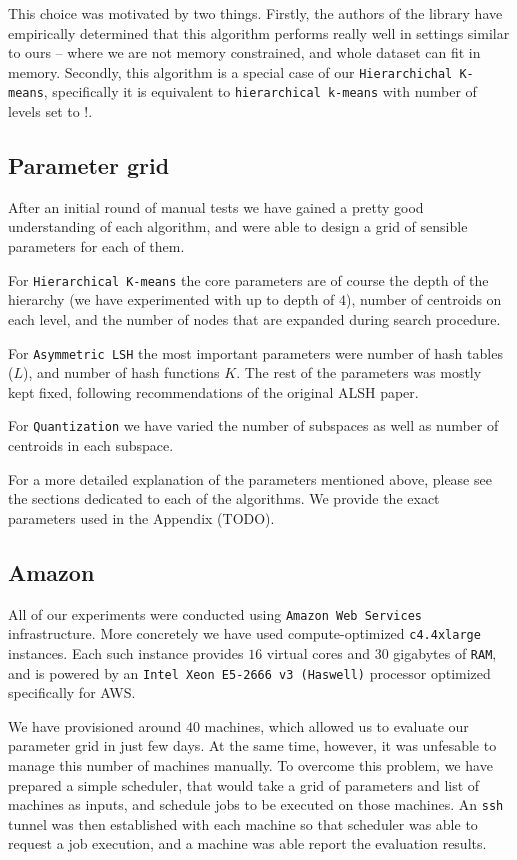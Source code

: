         This choice was motivated by two things.
        Firstly, the authors of the library have empirically determined that this algorithm performs
        really well in settings similar to ours -- where we are not memory constrained, and whole dataset
        can fit in memory.
        Secondly, this algorithm is a special case of our \texttt{Hierarchichal K-means}, specifically
        it is equivalent to \texttt{hierarchical k-means} with number of levels set to $!$.

    \subsection{Parameter grid}

        After an initial round of manual tests we have gained a pretty good understanding of
        each algorithm, and were able to design a grid of sensible parameters for each of them.

        For \texttt{Hierarchical K-means} the core parameters are of course the depth of the hierarchy
        (we have experimented with up to depth of $4$), number of centroids on each level,
        and the number of nodes that are expanded during search procedure.

        For \texttt{Asymmetric LSH} the most important parameters were number of hash tables ($L$),
        and number of hash functions $K$. The rest of the parameters was mostly kept fixed, following
        recommendations of the original ALSH paper.

        For \texttt{Quantization} we have varied the number of subspaces as well as number of centroids
        in each subspace.

        For a more detailed explanation of the parameters mentioned above, please see the sections
        dedicated to each of the algorithms.
        We provide the exact parameters used in the Appendix (TODO).

    \subsection{Amazon}

        All of our experiments were conducted using \texttt{Amazon Web Services} infrastructure.
        More concretely we have used compute-optimized \texttt{c4.4xlarge} instances. Each such
        instance provides $16$ virtual cores and $30$ gigabytes of \texttt{RAM}, and is powered
        by an \texttt{Intel Xeon E5-2666 v3 (Haswell)} processor optimized specifically for AWS.

        We have provisioned around $40$ machines, which allowed us to evaluate our parameter grid
        in just few days.
        At the same time, however, it was unfesable to manage this number of machines manually.
        To overcome this problem, we have prepared a simple scheduler,
        that would take a grid of parameters and list of machines as inputs, and schedule
        jobs to be executed on those machines.
        An \texttt{ssh} tunnel was then established with each machine so that scheduler
        was able to request a job execution, and a machine was able report the evaluation results.
